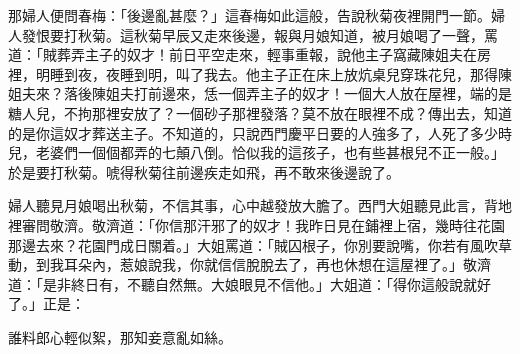 那婦人便問春梅：「後邊亂甚麼？」這春梅如此這般，告說秋菊夜裡開門一節。婦人發恨要打秋菊。這秋菊早辰又走來後邊，報與月娘知道，被月娘喝了一聲，罵道：「賊葬弄主子的奴才！前日平空走來，輕事重報，說他主子窩藏陳姐夫在房裡，明睡到夜，夜睡到明，叫了我去。他主子正在床上放炕桌兒穿珠花兒，那得陳姐夫來？落後陳姐夫打前邊來，恁一個弄主子的奴才！一個大人放在屋裡，端的是糖人兒，不拘那裡安放了？一個砂子那裡發落？莫不放在眼裡不成？傳出去，知道的是你這奴才葬送主子。不知道的，只說西門慶平日要的人強多了，人死了多少時兒，老婆們一個個都弄的七顛八倒。恰似我的這孩子，也有些甚根兒不正一般。」{}於是要打秋菊。唬得秋菊往前邊疾走如飛，再不敢來後邊說了。

婦人聽見月娘喝出秋菊，不信其事，心中越發放大膽了。{}西門大姐聽見此言，背地裡審問敬濟。敬濟道：「你信那汗邪了的奴才！我昨日見在鋪裡上宿，幾時往花園那邊去來？花園門成日關着。」大姐罵道：「賊囚根子，你別要說嘴，你若有風吹草動，到我耳朵內，惹娘說我，你就信信脫脫去了，再也休想在這屋裡了。」敬濟道：「是非終日有，不聽自然無。大娘眼見不信他。」{}大姐道：「得你這般說就好了。」正是：

\begin{myquote}
誰料郎心輕似絮，那知妾意亂如絲。
\end{myquote}

